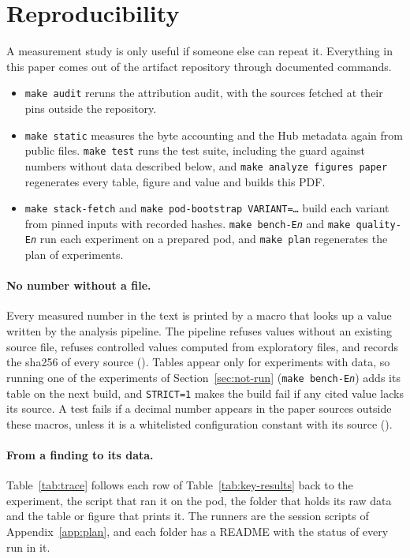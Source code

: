 \section{Reproducibility}\label{sec:repro}

A measurement study is only useful if someone else can repeat it. Everything in this paper comes out of the artifact
repository through documented commands.
\begin{itemize}
\item \texttt{make audit} reruns the attribution audit, with the sources fetched at their pins outside the repository.
\item \texttt{make static} measures the byte accounting and the Hub metadata again from public files.
\texttt{make test} runs the test suite, including the guard against numbers without data described below, and
\texttt{make analyze figures paper} regenerates every table, figure and value and builds this PDF.
\item \texttt{make stack-fetch} and \texttt{make pod-bootstrap VARIANT=\ldots} build each variant from pinned inputs
with recorded hashes. \texttt{make bench-E\textit{n}} and \texttt{make quality-E\textit{n}} run each experiment on a
prepared pod, and \texttt{make plan} regenerates the plan of experiments.
\end{itemize}

\paragraph{No number without a file.}
Every measured number in the text is printed by a macro that looks up a value written by the analysis pipeline. The
pipeline refuses values without an existing source file, refuses controlled values computed from exploratory files,
and records the sha256 of every source (). Tables appear only for experiments
with data, so running one of the experiments of Section~\ref{sec:not-run} (\texttt{make bench-E\textit{n}}) adds its
table on the next build, and \texttt{STRICT=1} makes the build fail if any cited value lacks its source. A test fails
if a decimal number appears in the paper sources outside these macros, unless it is a whitelisted configuration
constant with its source ().

\paragraph{From a finding to its data.}
Table~\ref{tab:trace} follows each row of Table~\ref{tab:key-results} back to the experiment, the script that ran it on
the pod, the folder that holds its raw data and the table or figure that prints it. The runners are the session
scripts of Appendix~\ref{app:plan}, and each folder has a README with the status of every run in it.

